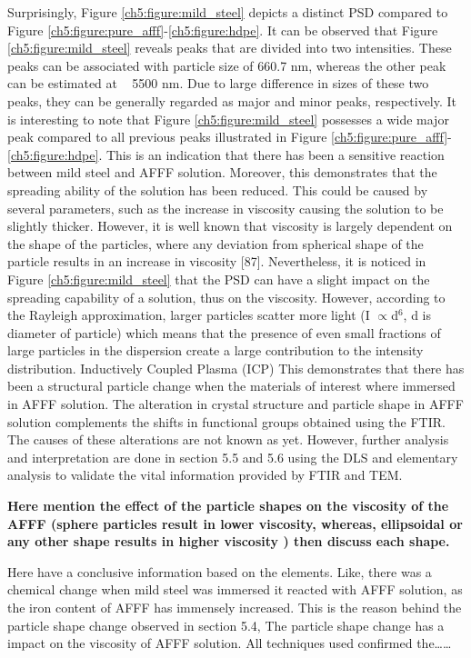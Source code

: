 \documentclass[12pt]{report}
\begin{document}
Surprisingly, Figure \ref{ch5:figure:mild_steel} depicts a distinct PSD compared to Figure \ref{ch5:figure:pure_afff}-\ref{ch5:figure:hdpe}. It can be observed that Figure \ref{ch5:figure:mild_steel} reveals peaks that are divided into two intensities. These peaks can be associated with particle size of 660.7 nm, whereas the other peak can be estimated at ~ 5500 nm.  Due to large difference in sizes of these two peaks, they can be generally regarded as major and minor peaks, respectively.  It is interesting to note that Figure \ref{ch5:figure:mild_steel} possesses a wide major peak compared to all previous peaks illustrated in Figure \ref{ch5:figure:pure_afff}-\ref{ch5:figure:hdpe}. This is an indication that there has been a sensitive reaction between mild steel and AFFF solution. Moreover, this demonstrates that the spreading ability of the solution has been reduced. This could be caused by several parameters, such as the increase in viscosity causing the solution to be slightly thicker. However, it is well known that viscosity is largely dependent on the shape of the particles, where any deviation from spherical shape of the particle results in an increase in viscosity [87]. Nevertheless, it is noticed in Figure \ref{ch5:figure:mild_steel} that the PSD can have a slight impact on the spreading capability of a solution, thus on the viscosity.
However, according to the Rayleigh approximation, larger particles scatter more light (I $\propto$d$^6$, d is diameter of particle) which means that the presence of even small fractions of large particles in the dispersion create a large contribution to the intensity distribution.
Inductively Coupled Plasma (ICP) 
This demonstrates that there has been a structural particle change when the materials of interest where immersed in AFFF solution. The alteration in crystal structure and particle shape in AFFF solution complements the shifts in functional groups obtained using the FTIR. The causes of these alterations are not known as yet. However, further analysis and interpretation are done in section 5.5 and 5.6 using the DLS and elementary analysis to validate the vital information provided by FTIR and TEM.

\textbf{Here mention the effect of the particle shapes on the viscosity of the AFFF (sphere particles result in lower viscosity, whereas, ellipsoidal or any other shape results in higher viscosity ) then discuss each shape.}

Here have a conclusive information based on the elements. Like, there was a chemical change when mild steel was immersed it reacted with AFFF solution, as the iron content of AFFF has immensely increased. This is the reason behind the particle shape change observed in section 5.4, The particle shape change has a impact on the viscosity of AFFF solution. 
All techniques used confirmed the……
  
\end{document}
